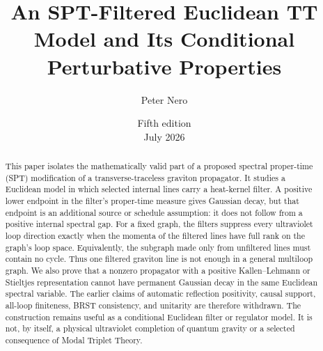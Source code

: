 \documentclass[11pt]{article}
\title{An SPT-Filtered Euclidean TT Model and Its Conditional Perturbative Properties}
\author{Peter Nero}
\date{Fifth edition\\July 2026}
\begin{document}
\maketitle

\begin{abstract}
This paper isolates the mathematically valid part of a proposed spectral
proper-time (SPT) modification of a transverse-traceless graviton propagator.
It studies a Euclidean model in which selected internal lines carry a
heat-kernel filter. A positive lower endpoint in the filter's proper-time
measure gives Gaussian decay, but that endpoint is an additional source or
schedule assumption: it does not follow from a positive internal spectral
gap. For a fixed graph, the filters suppress every ultraviolet loop
direction exactly when the momenta of the filtered lines have full rank on
the graph's loop space. Equivalently, the subgraph made only from unfiltered
lines must contain no cycle. Thus one filtered graviton line is not enough
in a general multiloop graph. We also prove that a nonzero propagator with a
positive Kallen--Lehmann or Stieltjes representation cannot have permanent
Gaussian decay in the same Euclidean spectral variable. The earlier claims
of automatic reflection positivity, causal support, all-loop finiteness,
BRST consistency, and unitarity are therefore withdrawn. The construction
remains useful as a conditional Euclidean filter or regulator model. It is
not, by itself, a physical ultraviolet completion of quantum gravity or a
selected consequence of Modal Triplet Theory.
\end{abstract}
\end{document}
